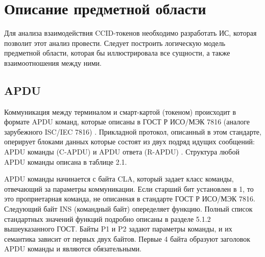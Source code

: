 \section{Описание предметной области}

Для анализа взаимодействия CCID-токенов необходимо разработать ИС, которая позволит этот анализ провести.
Следует построить логическую модель предметной области, которая бы иллюстрировала все сущности, а также взаимоотношения между ними.

\subsection{APDU}

Коммуникация между терминалом и смарт-картой (токеном) происходит в формате APDU команд, которые описаны в ГОСТ Р ИСО/МЭК 7816
(аналоге зарубежного ISC/IEC 7816) \cite{habr-apdu}. Прикладной протокол, описанный в этом стандарте, оперирует блоками
данных которые состоят из двух подряд идущих сообщений: APDU команды (C-APDU) и APDU ответа (R-APDU) \cite{gost-7816}.
Структура любой APDU команды описана в таблице 2.1.

\begin{table}[ht]
  \begin{center}
  \caption{Структура APDU команды}
  \end{center}
\end{table}

APDU команды начинается с байта CLA, который задает класс команды, отвечающий за параметры коммуникации. Если старший бит установлен в 1,
то это проприетарная команда, не описанная в стандарте ГОСТ Р ИСО/МЭК 7816. Следующий байт INS (командный байт) опеределяет функцию.
Полный список стандартных значений функций подробно описаны в разделе 5.1.2 вышеуказанного ГОСТ. Байты P1 и P2 задают параметры команды, и
их семантика зависит от первых двух байтов. Первые 4 байта образуют заголовок APDU команды и являются обязательными.

